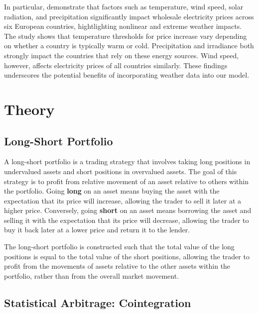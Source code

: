 \documentclass[12pt]{article}
\begin{document}
In particular, \citet{MOSQUERALOPEZ2024} demonstrate that factors such as temperature, wind speed, solar radiation, and precipitation significantly impact wholesale electricity prices across six European countries, hightlighting nonlinear and extreme weather impacts. 
The study shows that temperature thresholds for price increase vary depending on whether a country is typically warm or cold.
Precipitation and irradiance both strongly impact the countries that rely on these energy sources. Wind speed, however, affects electricity prices of all countries similarly. These findings underscores the potential benefits of incorporating weather data into our model.


    



\clearpage




\section{Theory}

\subsection{Long-Short Portfolio}
A long-short portfolio is a trading strategy that involves taking long positions in undervalued assets and short positions in overvalued assets. The goal of this strategy is to profit from relative movement of an asset relative to others within the portfolio. 
Going \textbf{long} on an asset means buying the asset with the expectation that its price will increase, allowing the trader to sell it later at a higher price. Conversely, going \textbf{short} on an asset means borrowing the asset and selling it with the expectation that its price will decrease, allowing the trader to buy it back later at a lower price and return it to the lender.

The long-short portfolio is constructed such that the total value of the long positions is equal to the total value of the short positions, allowing the trader to profit from the movements of assets relative to the other assets within the portfolio, rather than from the overall market movement.

\subsection{Statistical Arbitrage: Cointegration}
\end{document}
